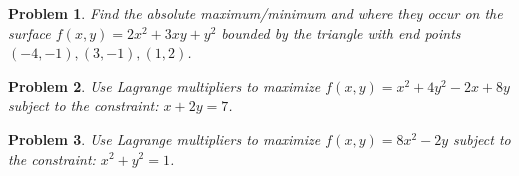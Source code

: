 \documentclass[11pt]{article}
\newtheorem{problem}{Problem}
\begin{document}
\begin{problem} 
    Find the absolute maximum/minimum and where they occur on the surface $f(x,y) = 2x^2+3xy+y^2$ bounded by the triangle with end points $(-4,-1),(3,-1),(1,2)$.
\end{problem}

\begin{problem}
Use Lagrange multipliers to maximize $f(x,y) = x^2 + 4y^2 - 2x +8y $ subject to the constraint: $x + 2y = 7$.
\end{problem}

\begin{problem}
Use Lagrange multipliers to maximize $f(x,y) = 8x^2 - 2y$ subject to the constraint: $x^2 + y^2 = 1$.
\end{problem}
\end{document}

